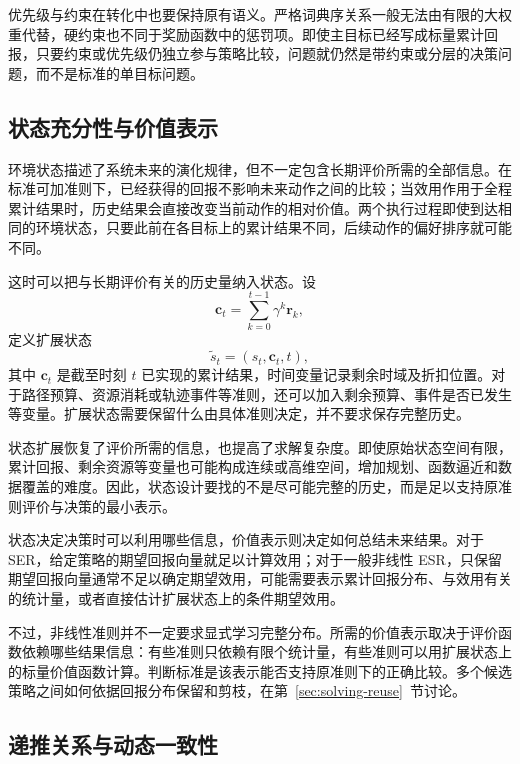 优先级与约束在转化中也要保持原有语义。严格词典序关系一般无法由有限的大权重代替，硬约束也不同于奖励函数中的惩罚项\cite{skalse2022,achiam2017}。即使主目标已经写成标量累计回报，只要约束或优先级仍独立参与策略比较，问题就仍然是带约束或分层的决策问题，而不是标准的单目标问题。

\subsection{状态充分性与价值表示}\label{sec:structure-state}

环境状态描述了系统未来的演化规律，但不一定包含长期评价所需的全部信息。在标准可加准则下，已经获得的回报不影响未来动作之间的比较；当效用作用于全程累计结果时，历史结果会直接改变当前动作的相对价值。两个执行过程即使到达相同的环境状态，只要此前在各目标上的累计结果不同，后续动作的偏好排序就可能不同。

这时可以把与长期评价有关的历史量纳入状态。设
\begin{equation}
\mathbf c_t
=
\sum_{k=0}^{t-1}\gamma^k\mathbf r_k,
\end{equation}
定义扩展状态
\begin{equation}\label{eq:augmented-state}
\tilde s_t=(s_t,\mathbf c_t,t),
\end{equation}
其中 \(\mathbf c_t\) 是截至时刻 \(t\) 已实现的累计结果，时间变量记录剩余时域及折扣位置。对于路径预算、资源消耗或轨迹事件等准则，还可以加入剩余预算、事件是否已发生等变量。扩展状态需要保留什么由具体准则决定，并不要求保存完整历史\cite{bauerle2014,hayes2023}。


状态扩展恢复了评价所需的信息，也提高了求解复杂度。即使原始状态空间有限，累计回报、剩余资源等变量也可能构成连续或高维空间，增加规划、函数逼近和数据覆盖的难度。因此，状态设计要找的不是尽可能完整的历史，而是足以支持原准则评价与决策的最小表示。

状态决定决策时可以利用哪些信息，价值表示则决定如何总结未来结果。对于 SER，给定策略的期望回报向量就足以计算效用；对于一般非线性 ESR，只保留期望回报向量通常不足以确定期望效用，可能需要表示累计回报分布、与效用有关的统计量，或者直接估计扩展状态上的条件期望效用\cite{hayes2023,bauerle2014}。

不过，非线性准则并不一定要求显式学习完整分布。所需的价值表示取决于评价函数依赖哪些结果信息：有些准则只依赖有限个统计量，有些准则可以用扩展状态上的标量价值函数计算。判断标准是该表示能否支持原准则下的正确比较。多个候选策略之间如何依据回报分布保留和剪枝，在第~\ref{sec:solving-reuse}~节讨论。

\subsection{递推关系与动态一致性}\label{sec:structure-recursion}


